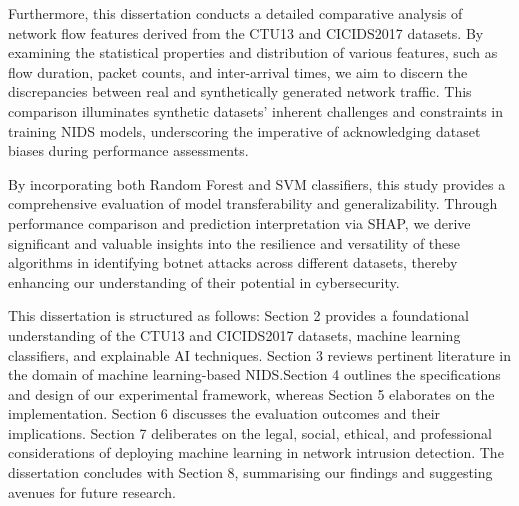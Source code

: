 Furthermore, this dissertation conducts a detailed comparative analysis of network flow features derived from the CTU13 and CICIDS2017 datasets. By examining the statistical properties and distribution of various features, such as flow duration, packet counts, and inter-arrival times, we aim to discern the discrepancies between real and synthetically generated network traffic. This comparison illuminates synthetic datasets’ inherent challenges and constraints in training NIDS models, underscoring the imperative of acknowledging dataset biases during performance assessments.

By incorporating both Random Forest and SVM classifiers, this study provides a comprehensive evaluation of model transferability and generalizability. Through performance comparison and prediction interpretation via SHAP, we derive significant and valuable insights into the resilience and versatility of these algorithms in identifying botnet attacks across different datasets, thereby enhancing our understanding of their potential in cybersecurity.

This dissertation is structured as follows: Section 2 provides a foundational understanding of the CTU13 and CICIDS2017 datasets, machine learning classifiers, and explainable AI techniques. Section 3 reviews pertinent literature in the domain of machine learning-based NIDS.\@ Section 4 outlines the specifications and design of our experimental framework, whereas Section 5 elaborates on the implementation. Section 6 discusses the evaluation outcomes and their implications. Section 7 deliberates on the legal, social, ethical, and professional considerations of deploying machine learning in network intrusion detection. The dissertation concludes with Section 8, summarising our findings and suggesting avenues for future research.